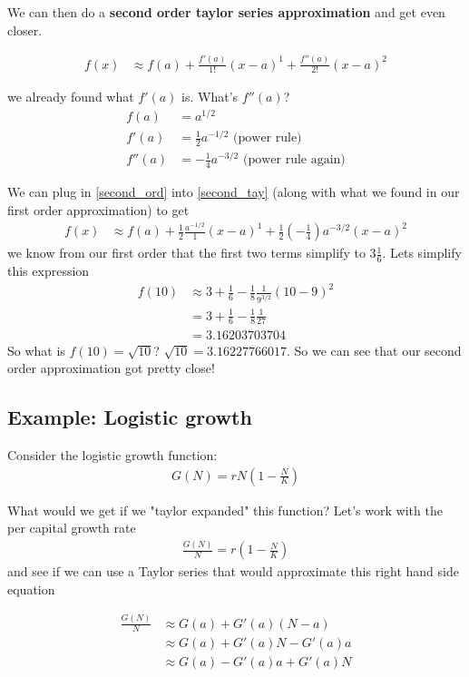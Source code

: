 \documentclass{article}
\begin{document}
We can then do a \textbf{second order taylor series approximation} and get even closer.

\begin{align}
    f(x) &\approx f(a) + \frac{f'(a)}{1!}(x-a)^1 + \frac{f''(a)}{2!} (x-a)^2 \label{second_tay}
\end{align}

we already found what $f'(a)$ is. What's $f''(a)$? 
\begin{align}
    f(a) &= a^{1/2}\\
    f'(a) &= \frac{1}{2} a^{-1/2} \text{ (power rule)}\\
    f''(a) &= -\frac{1}{4} a^{-3/2} \text{ (power rule again)} \label{second_ord}
\end{align}

We can plug in \ref{second_ord} into \ref{second_tay} (along with what we found in our first order approximation) to get 
\begin{align}
     f(x) &\approx f(a) + \frac{1}{2} \frac{a^{-1/2}}{1} (x - a)^1 + \frac{1}{2} (-\frac{1}{4}) a^{-3/2} (x - a)^{2}
\end{align}
we know from our first order that the first two terms simplify to $3 \frac{1}{6}$. Lets simplify this expression 
\begin{align}
    f(10) &\approx 3 + \frac{1}{6} -\frac{1}{8}\frac{1}{9^{3/2}} (10 - 9)^2\\
    &= 3 + \frac{1}{6} -\frac{1}{8}\frac{1}{27}\\
    &= 3.16203703704
\end{align}
So what is $f(10) = \sqrt{10}$? $\sqrt{10} = 3.16227766017$. So we can see that our second order approximation got pretty close! 

\subsection{Example: Logistic growth}
Consider the logistic growth function: 
\begin{align}
    G(N) = rN (1 - \frac{N}{K})
\end{align}

What would we get if we "taylor expanded" this function? Let's work with the per capital growth rate
\begin{align}
    \frac{G(N)}{N} = r(1 - \frac{N}{K}) \label{per_cap}
\end{align}
and see if we can use a Taylor series that would approximate this right hand side equation

\begin{align}
    \frac{G(N)}{N} &\approx G(a) + G'(a) (N-a)\\
    &\approx G(a) + G'(a)N - G'(a)a \\
    & \approx G(a) - G'(a)a + G'(a) N
\end{align}
\end{document}
